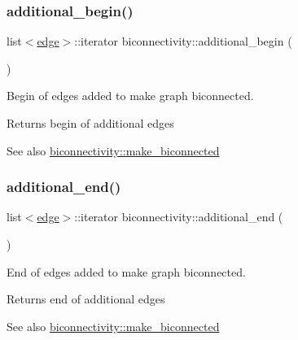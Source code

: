 \subsubsection{\texorpdfstring{additional\+\_\+begin()}{additional\_begin()}}
{\footnotesize\ttfamily list$<$\mbox{\hyperlink{classedge}{edge}}$>$\+::iterator biconnectivity\+::additional\+\_\+begin (\begin{DoxyParamCaption}{ }\end{DoxyParamCaption})\hspace{0.3cm}{\ttfamily [inline]}}



Begin of edges added to make graph biconnected. 

\begin{DoxyReturn}{Returns}
begin of additional edges 
\end{DoxyReturn}
\begin{DoxySeeAlso}{See also}
\mbox{\hyperlink{classbiconnectivity_a774fd08203a6d164605afc4cdc8b9201}{biconnectivity\+::make\+\_\+biconnected}} 
\end{DoxySeeAlso}
\mbox{\label{classbiconnectivity_a447a86f387efd181b25b8bacf3365e75}} 
\subsubsection{\texorpdfstring{additional\+\_\+end()}{additional\_end()}}
{\footnotesize\ttfamily list$<$\mbox{\hyperlink{classedge}{edge}}$>$\+::iterator biconnectivity\+::additional\+\_\+end (\begin{DoxyParamCaption}{ }\end{DoxyParamCaption})\hspace{0.3cm}{\ttfamily [inline]}}



End of edges added to make graph biconnected. 

\begin{DoxyReturn}{Returns}
end of additional edges 
\end{DoxyReturn}
\begin{DoxySeeAlso}{See also}
\mbox{\hyperlink{classbiconnectivity_a774fd08203a6d164605afc4cdc8b9201}{biconnectivity\+::make\+\_\+biconnected}} 
\end{DoxySeeAlso}
\mbox{\label{classbiconnectivity_a69ca91409485b57c486b188596080d7a}} 
